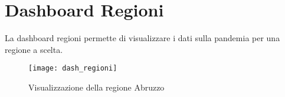 \subsection{}

\section{Dashboard Regioni}
La dashboard regioni permette di visualizzare i dati sulla pandemia per una regione a scelta.

\begin{figure}[htp]
    \centering
    \texttt{[image: dash\_regioni]}
    \caption{Visualizzazione della regione Abruzzo}
    \label{fig:dash_regioni}
\end{figure}

